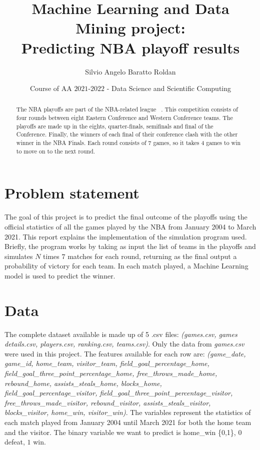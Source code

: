 \documentclass{article}
\title{Machine Learning and Data Mining project:\\Predicting NBA playoff results}
\author{Silvio Angelo Baratto Roldan}
\date{Course of AA $2021$-$2022$ - Data Science and Scientific Computing}
\begin{document}
\maketitle
\begin{abstract}
The NBA playoffs are part of the NBA-related league ~\cite{Wikipedia-playoffs}. This competition consists of four rounds between eight Eastern Conference and Western Conference teams. The playoffs are made up in the eights, quarter-finals, semifinals and final of the Conference. Finally, the winners of each final of their conference clash with the other winner in the NBA Finals. Each round consists of 7 games, so it takes 4 games to win to move on to the next round.
\end{abstract}
\section{Problem statement}
The goal of this project is  to predict the final outcome of the playoffs using the official statistics of all the games played by the NBA from January 2004 to March 2021. This report explains the implementation of the simulation program used. Briefly, the program works by taking as input the list of teams in the playoffs and simulates $N$ times $7$ matches for each round, returning as the final output a probability of victory for each team. In each match played, a Machine Learning model is used to predict the winner.
\label{section: ProblemStatement}
\section{Data}
\label{section: Data}
The complete dataset available is made up of 5 .csv files: \emph{(games.csv, games details.csv, players.csv, ranking.csv, teams.csv)}. Only the data from \emph{games.csv} were used in this project. The features available for each row are: \emph{(game\_date, game\_id, home\_team, visitor\_team, field\_goal\_percentage\_home, field\_goal\_three\_point\_percentage\_home, free\_throws\_made\_home, rebound\_home, assists\_steals\_home, blocks\_home, field\_goal\_percentage\_visitor, field\_goal\_three\_point\_percentage\_visitor, free\_throws\_made\_visitor, rebound\_visitor, assists\_steals\_visitor, blocks\_visitor, home\_win, visitor\_win)}. The variables represent the statistics of each match played from January 2004 until March 2021 for both the home team and the visitor. The binary variable we want to predict is home\_win \{0,1\}, $ 0 $ defeat, $ 1 $ win.
\end{document}
